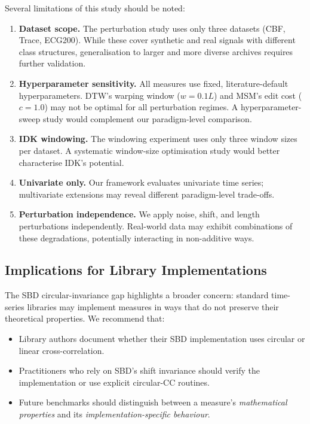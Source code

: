 Several limitations of this study should be noted:

\begin{enumerate}
    \item \textbf{Dataset scope.} The perturbation study uses only three datasets (CBF, Trace, ECG200). While these cover synthetic and real signals with different class structures, generalisation to larger and more diverse archives requires further validation.

    \item \textbf{Hyperparameter sensitivity.} All measures use fixed, literature-default hyperparameters. DTW's warping window ($w = 0.1L$) and MSM's edit cost ($c = 1.0$) may not be optimal for all perturbation regimes. A hyperparameter-sweep study would complement our paradigm-level comparison.

    \item \textbf{IDK windowing.} The windowing experiment uses only three window sizes per dataset. A systematic window-size optimisation study would better characterise IDK's potential.

    \item \textbf{Univariate only.} Our framework evaluates univariate time series; multivariate extensions may reveal different paradigm-level trade-offs.

    \item \textbf{Perturbation independence.} We apply noise, shift, and length perturbations independently. Real-world data may exhibit combinations of these degradations, potentially interacting in non-additive ways.
\end{enumerate}

\subsection{Implications for Library Implementations}\label{sec:discuss-implementation}

The SBD circular-invariance gap highlights a broader concern: standard time-series libraries may implement measures in ways that do not preserve their theoretical properties.
We recommend that:
\begin{itemize}
    \item Library authors document whether their SBD implementation uses circular or linear cross-correlation.
    \item Practitioners who rely on SBD's shift invariance should verify the implementation or use explicit circular-CC routines.
    \item Future benchmarks should distinguish between a measure's \emph{mathematical properties} and its \emph{implementation-specific behaviour}.
\end{itemize}

